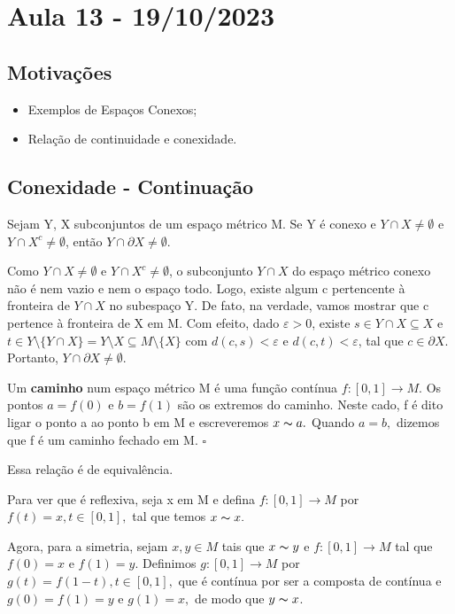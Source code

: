 \documentclass[MetricSpaces/metric_notes.tex]{subfiles}
\begin{document}
\section{Aula 13 - 19/10/2023}
\subsection{Motivações}
\begin{itemize}
	\item Exemplos de Espaços Conexos;
	\item Relação de continuidade e conexidade.
\end{itemize}
\subsection{Conexidade - Continuação}
\begin{theorem*}[Alfândega]
	Sejam Y, X subconjuntos de um espaço métrico M. Se Y é conexo e \(Y\cap X \neq\emptyset\) e \(Y\cap X^{c}\neq\emptyset\), então
	\(Y\cap \partial X \neq\emptyset.\)
\end{theorem*}
\begin{proof*}
	Como \(Y\cap X \neq\emptyset\) e \(Y\cap X^{c} \neq\emptyset\), o subconjunto \(Y \cap X\) do espaço métrico conexo
	não é nem vazio e nem o espaço todo. Logo, existe algum c pertencente à fronteira de \(Y\cap X\) no subespaço Y. De fato,
	na verdade, vamos mostrar que c pertence à fronteira de X em M. Com efeito, dado \(\varepsilon >0\), existe \(s\in Y\cap X\subseteq{X}\) e
	\(t\in Y\setminus\{Y\cap X\} = Y\setminus{X}\subseteq{M\setminus\{X\}}\) com \(d(c, s) < \varepsilon \) e \(d(c, t) < \varepsilon \), tal que
	\(c\in \partial X\). Portanto, \(Y\cap \partial X \neq\emptyset.\) \qedsymbol
\end{proof*}
\begin{def*}
	Um \textbf{caminho} num espaço métrico M é uma função contínua \(f:[0, 1]\rightarrow M.\) Os pontos \(a = f(0)\) e \(b = f(1)\) são os extremos
	do caminho. Neste cado, f é dito ligar o ponto a ao ponto b em M e escreveremos \(x\thicksim a.\) Quando \(a = b,\) dizemos que f é um caminho fechado
	em M. \(\square\)
\end{def*}
Essa relação é de equivalência.

Para ver que é reflexiva, seja x em M e defina \(f:[0, 1]\rightarrow M\) por \(f(t) = x, t\in [0, 1],\) tal que temos \(x\thicksim x.\)

Agora, para a simetria, sejam \(x, y\in M\) tais que \(x\thicksim y\) e \(f:[0, 1]\rightarrow M\) tal que \(f(0) = x\) e \(f(1) = y\). Definimos \(g:[0, 1]\rightarrow M\) por
\(g(t) = f(1-t), t\in [0, 1],\) que é contínua por ser a composta de contínua e \(g(0) = f(1) = y\) e \(g(1) = x,\) de modo que \(y\thicksim x\).
\end{document}
